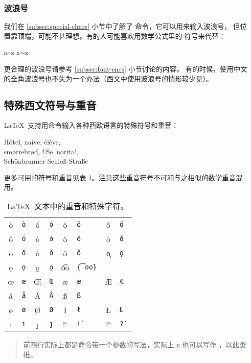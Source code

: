 {\subsubsection{波浪号}

我们在 \ref{subsec:special-chars} 小节中了解了 \cmd{\textasciitilde} 命令，它可以用来输入波浪号，
但位置靠顶端，可能不甚理想。有的人可能喜欢用数学公式里的  符号来代替：
\begin{example}
a\~{}z \qquad a$\sim$z
\end{example}

更合理的波浪号请参考 \ref{subsec:font-encs} 小节讨论的内容。
有的时候，使用中文的全角波浪号也不失为一个办法（西文中使用波浪号的情形较少见）。

\subsection{特殊西文符号与重音}\label{subsec:accents}

\LaTeX\ 支持用命令输入各种西欧语言的特殊符号和重音：
\begin{example}
H\^otel, na\"\i ve, \'el\`eve,\\
sm\o rrebr\o d, !`Se\ norita!,\\
Sch\"onbrunner Schlo\ss{}
Stra\ss e
\end{example}

更多可用的符号和重音见表 \ref{tbl:accents}。注意这些重音符号不可和与之相似的数学重音混用。

\def\TSYM #1{#1       & \texttt{\string#1}}
\def\TACC #1#2{#1{#2} & \texttt{\string#1#2}}       %
\def\TTACC #1#2{#1{#2} & \texttt{\string#1 #2}}     %
\def\WTACC #1#2{#1{#2} & \texttt{\string#1\{#2\}}}  %
\begin{table}[htbp]
\centering
\caption{\LaTeX\ 文本中的重音和特殊字符。} \label{tbl:accents}
\begin{tabular}{*4{cl}}
 \hline
 \TACC{\`}{o} & \TACC{\'}{o} & \TACC{\^}{o} & \TACC{\~}{o} \\
 \TACC{\=}{o} & \TACC{\.}{o} & \TACC{\"}{o} & \TTACC{\r}{o}\\
 \TTACC{\u}{o} & \TTACC{\v}{o} & \TTACC{\H}{o} & \TTACC{\c}{o} \\
 \TTACC{\d}{o} & \TTACC{\b}{o} & \WTACC{\t}{oo} \\[6pt]
 \TSYM{\oe} & \TSYM{\OE} & \TSYM{\ae} & \TSYM{\AE} \\
 \TSYM{\aa} & \TSYM{\AA} & \TSYM{\ss} \\[6pt]
 \TSYM{\o}  & \TSYM{\O}  & \TSYM{\l} & \TSYM{\L} \\
 \TSYM{\i}  & \TSYM{\j}  & !` & \verb|!`| & ?` & \verb|?`| \\
 \hline
\end{tabular}
\begin{quote}\footnotesize%
前四行实际上都是命令带一个参数的写法，实际上 \cmd{\textasciicircum}\texttt{o} 也可以写作
\cmd{\textasciicircum}，以此类推。
\end{quote}
\end{table}

}
